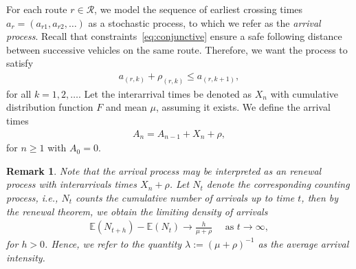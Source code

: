\documentclass[a4paper]{report}
\theoremstyle{definition}
\theoremstyle{plain}
\newtheorem{remark}{Remark}[chapter]
\begin{document}
For each route $r \in \mathcal{R}$, we model the sequence of earliest crossing times
$a_{r} = (a_{r1}, a_{r2}, \dots)$ as a stochastic process, to which we refer as
the \textit{arrival process}. Recall that constraints~\eqref{eq:conjunctive}
ensure a safe following distance between successive vehicles on the same route.
Therefore, we want the process to satisfy
\begin{align*}
  a_{(r, k)} + \rho_{(r,k)} \leq a_{(r, k + 1)} ,
\end{align*}
for all $k = 1, 2, \dots$.
%
Let the interarrival times be denoted as $X_{n}$ with cumulative distribution
function $F$ and mean $\mu$, assuming it exists. We define the arrival times
\begin{align*}
 A_{n} = A_{n-1} + X_{n} + \rho,
\end{align*}
 for $n \geq 1$ with $A_{0} = 0$.

\begin{remark}
Note that the arrival process may be interpreted as an renewal process with interarrivals
times $X_{n} + \rho$.
%
%
Let $N_{t}$ denote the corresponding counting process, i.e., $N_{t}$ counts the
cumulative number of arrivals up to time $t$, then by the \textit{renewal theorem}, we
obtain the \textit{limiting density} of arrivals
%
\begin{align*}
  \mathbb{E}(N_{t + h}) - \mathbb{E}(N_{t}) \rightarrow \frac{h}{\mu + \rho} \quad \text{ as } t \rightarrow \infty ,
\end{align*}
for $h > 0$. Hence, we refer to the quantity $\lambda := {(\mu + \rho)}^{-1}$ as the
average arrival intensity.
\end{remark}

%
\end{document}

